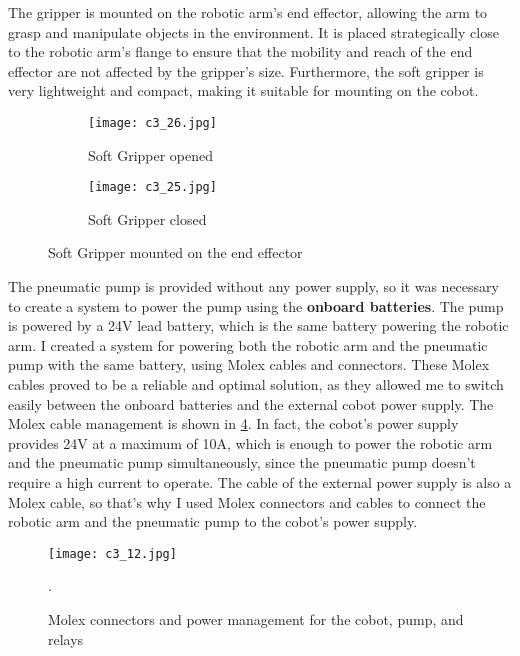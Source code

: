 The gripper is mounted on the robotic arm's end effector, allowing the arm to grasp and manipulate
objects in the environment. It is placed strategically close to the robotic arm's flange to ensure
that the mobility and reach of the end effector are not affected by the gripper's size.
Furthermore, the soft gripper is very lightweight and compact, making it suitable for mounting on the cobot.

\begin{figure}[t]
    \centering
    \begin{subfigure}{0.45\textwidth}
        \texttt{[image: c3\_26.jpg]}
        \caption{Soft Gripper opened}
        \label{fig:opened}
    \end{subfigure}
    \hfill %
    \begin{subfigure}{0.45\textwidth}
        \texttt{[image: c3\_25.jpg]}
        \caption{Soft Gripper closed}
        \label{fig:closed}
    \end{subfigure}
    \caption{Soft Gripper mounted on the end effector}
    \label{fig:sg_combined}
\end{figure}

The pneumatic pump is provided without any power supply, so it was necessary to create a system to power the pump
using the \textbf{onboard batteries}. The pump is powered by a 24V lead battery, which is the same battery powering
the robotic arm. I created a system for powering both the robotic arm and the pneumatic pump with the same battery,
using Molex cables and connectors. These Molex cables proved to be a reliable and optimal solution,
as they allowed me to switch easily between the onboard batteries and the external cobot power supply.
The Molex cable management is shown in \ref{fig:c3_img12}.
In fact, the cobot's power supply provides 24V at a maximum of 10A, which is enough to power the robotic arm
and the pneumatic pump simultaneously, since the pneumatic pump doesn't require a high current to operate.
The cable of the external power supply is also a Molex cable, so that's why I used Molex connectors and cables
to connect the robotic arm and the pneumatic pump to the cobot's power supply.

\begin{figure}[t]
    \centering
    \texttt{[image: c3\_12.jpg]}
    \captionsetup{width=1\linewidth}
    \caption{Molex connectors and power management for the cobot, pump, and relays}.
    \label{fig:c3_img12}
\end{figure}

